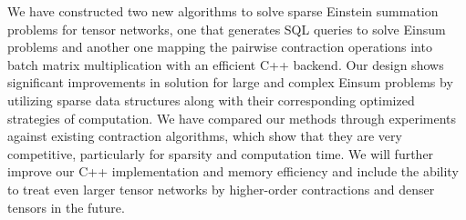 We have constructed two new algorithms to solve sparse Einstein summation 
problems for tensor networks, one that generates SQL queries to solve Einsum 
problems and another one mapping the pairwise contraction operations into 
batch matrix multiplication with an efficient C++ backend. Our design shows 
significant improvements in solution for large and complex Einsum problems 
by utilizing sparse data structures along with their corresponding optimized 
strategies of computation. We have compared our methods through experiments 
against existing contraction algorithms, which show that they are very competitive, 
particularly for sparsity and computation time. We will further improve our 
C++ implementation and memory efficiency and include the ability to treat 
even larger tensor networks by higher-order contractions and denser tensors 
in the future.  